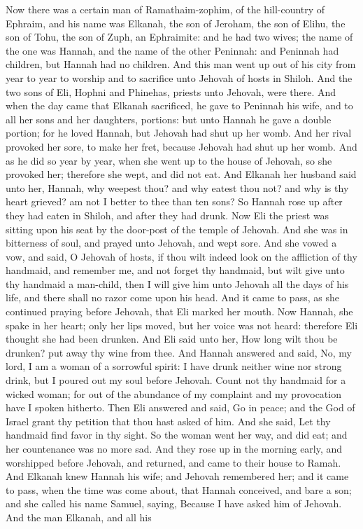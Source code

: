 


Now there was a certain man of Ramathaim-zophim, of the hill-country of Ephraim, and his name was Elkanah, the son of Jeroham, the son of Elihu, the son of Tohu, the son of Zuph, an Ephraimite: and he had two wives; the name of the one was Hannah, and the name of the other Peninnah: and Peninnah had children, but Hannah had no children. And this man went up out of his city from year to year to worship and to sacrifice unto Jehovah of hosts in Shiloh. And the two sons of Eli, Hophni and Phinehas, priests unto Jehovah, were there. And when the day came that Elkanah sacrificed, he gave to Peninnah his wife, and to all her sons and her daughters, portions: but unto Hannah he gave a double portion; for he loved Hannah, but Jehovah had shut up her womb. And her rival provoked her sore, to make her fret, because Jehovah had shut up her womb. And as he did so year by year, when she went up to the house of Jehovah, so she provoked her; therefore she wept, and did not eat. And Elkanah her husband said unto her, Hannah, why weepest thou? and why eatest thou not? and why is thy heart grieved? am not I better to thee than ten sons?  So Hannah rose up after they had eaten in Shiloh, and after they had drunk. Now Eli the priest was sitting upon his seat by the door-post of the temple of Jehovah. And she was in bitterness of soul, and prayed unto Jehovah, and wept sore. And she vowed a vow, and said, O Jehovah of hosts, if thou wilt indeed look on the affliction of thy handmaid, and remember me, and not forget thy handmaid, but wilt give unto thy handmaid a man-child, then I will give him unto Jehovah all the days of his life, and there shall no razor come upon his head.  And it came to pass, as she continued praying before Jehovah, that Eli marked her mouth. Now Hannah, she spake in her heart; only her lips moved, but her voice was not heard: therefore Eli thought she had been drunken. And Eli said unto her, How long wilt thou be drunken? put away thy wine from thee. And Hannah answered and said, No, my lord, I am a woman of a sorrowful spirit: I have drunk neither wine nor strong drink, but I poured out my soul before Jehovah. Count not thy handmaid for a wicked woman; for out of the abundance of my complaint and my provocation have I spoken hitherto. Then Eli answered and said, Go in peace; and the God of Israel grant thy petition that thou hast asked of him. And she said, Let thy handmaid find favor in thy sight. So the woman went her way, and did eat; and her countenance was no more sad.  And they rose up in the morning early, and worshipped before Jehovah, and returned, and came to their house to Ramah. And Elkanah knew Hannah his wife; and Jehovah remembered her; and it came to pass, when the time was come about, that Hannah conceived, and bare a son; and she called his name Samuel, saying, Because I have asked him of Jehovah.  And the man Elkanah, and all his 